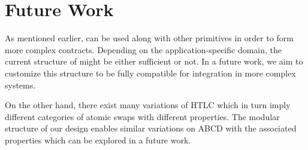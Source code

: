 \section{Future Work}

As mentioned earlier, \abcd can be used along with other primitives in order to form more complex contracts. Depending on the application-specific domain, the current structure of \abcd might be either sufficient or not. In a future work, we aim to customize this structure to be fully compatible for integration in more complex systems.

On the other hand, there exist many variations of HTLC which in turn imply different categories of atomic swaps with different properties. The modular structure of our design enables similar variations on ABCD with the associated properties which can be explored in a future work.  
